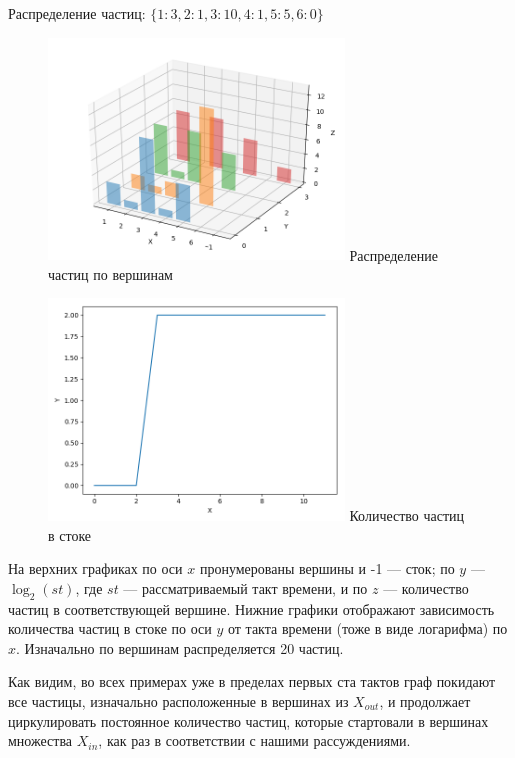 \begin{example}
	Распределение частиц: $\{1: 3, 2: 1, 3: 10, 4: 1, 5: 5, 6: 0\}$
	
	\begin{figure}
		\centering	
		{\includegraphics[width=0.7\textwidth]{img/e3.png}}
		{Распределение частиц по вершинам}
		\label{fig:pic_e2}
	\end{figure}
	
	\begin{figure}
		\centering	
		{\includegraphics[width=0.7\textwidth]{img/e33.png}}
		{Количество частиц в стоке}
		\label{fig:pic_e22}
	\end{figure}
	
\end{example}

На верхних графиках по оси $x$ пронумерованы вершины и -1 --- сток; по $y$ --- $\log_2(st)$, где $st$ --- рассматриваемый такт времени, и по $z$ --- количество частиц в соответствующей вершине. Нижние графики отображают зависимость количества частиц в стоке по оси $y$ от такта времени (тоже в виде логарифма) по $x$. Изначально по вершинам распределяется 20 частиц.

Как видим, во всех примерах уже в пределах первых ста тактов граф покидают все частицы, изначально расположенные в вершинах из $X_{out}$, и продолжает циркулировать постоянное количество частиц, которые стартовали в вершинах множества $X_{in}$, как раз в соответствии с нашими рассуждениями.



